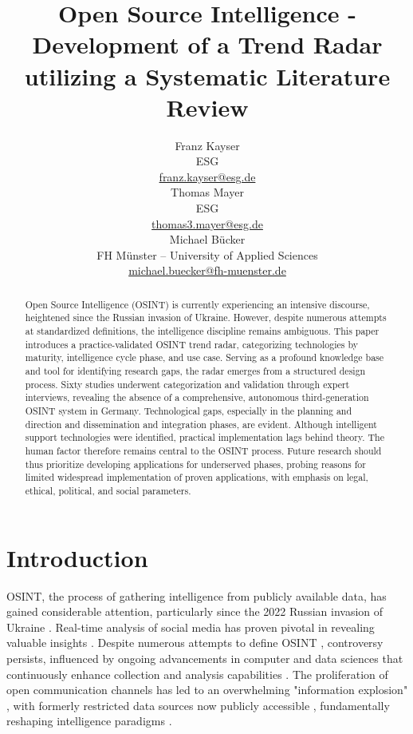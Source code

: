 \documentclass[10pt]{article}
\title{Open Source Intelligence - Development of a Trend Radar utilizing a Systematic Literature Review}
\author{Franz Kayser \\
  ESG \\
  {\underline{ franz.kayser@esg.de}} \\\And
  Thomas Mayer \\
  ESG  \\
  {\underline{ thomas3.mayer@esg.de} }\\\And 
  Michael Bücker \\
  FH Münster -- University of Applied Sciences\\
  {\underline{michael.buecker@fh-muenster.de}} \\}
\date{}
\begin{document}
\maketitle
\begin{abstract}
    Open Source Intelligence (OSINT) is currently experiencing an intensive discourse,
    heightened since the Russian invasion of Ukraine. However, despite numerous attempts
    at standardized definitions, the intelligence discipline remains ambiguous. This paper
    introduces a practice-validated OSINT trend radar, categorizing technologies by maturity,
    intelligence cycle phase, and use case. Serving as a profound knowledge base and tool for
    identifying research gaps, the radar emerges from a structured design process. Sixty
    studies underwent categorization and validation through expert interviews,
    revealing the absence of a comprehensive, autonomous third-generation OSINT
    system in Germany. Technological gaps, especially in the planning and direction and
    dissemination and integration phases, are evident. Although intelligent support
    technologies were identified, practical implementation lags behind theory. The human
    factor therefore remains central to the OSINT process. Future research should thus
    prioritize developing applications for underserved phases, probing reasons for limited
    widespread implementation of proven applications, with emphasis on legal, ethical,
    political, and social parameters.
\end{abstract}

\section{Introduction} \label{sec:introduction}

OSINT, the process of gathering intelligence from publicly available data, has gained considerable attention, particularly since the 2022 Russian invasion of Ukraine \cite{DosPassos.2017}. Real-time analysis of social media has proven pivotal in revealing valuable insights \cite{Hatfield.2023, SmithBoyle.24.07.2023}. Despite numerous attempts to define OSINT \cite{Hwang.2022, PastorGalindo.2020, Yogish.2021}, controversy persists, influenced by ongoing advancements in computer and data sciences that continuously enhance collection and analysis capabilities \cite{Ghioni.2023, Williams.2018}. The proliferation of open communication channels has led to an overwhelming "information explosion" \cite{DosPassos.2017, Hwang.2022, Yogish.2021}, with formerly restricted data sources now publicly accessible \cite{Hwang.2022, Williams.2018}, fundamentally reshaping intelligence paradigms \cite{Dokman.2020}.
\end{document}
